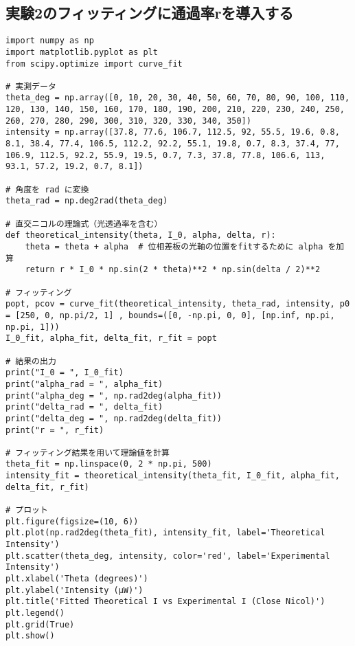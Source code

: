 \documentclass{article}
\begin{document}
\subsection*{実験2のフィッティングに通過率rを導入する}
\begin{lstlisting}
import numpy as np
import matplotlib.pyplot as plt
from scipy.optimize import curve_fit

# 実測データ
theta_deg = np.array([0, 10, 20, 30, 40, 50, 60, 70, 80, 90, 100, 110, 120, 130, 140, 150, 160, 170, 180, 190, 200, 210, 220, 230, 240, 250, 260, 270, 280, 290, 300, 310, 320, 330, 340, 350])
intensity = np.array([37.8, 77.6, 106.7, 112.5, 92, 55.5, 19.6, 0.8, 8.1, 38.4, 77.4, 106.5, 112.2, 92.2, 55.1, 19.8, 0.7, 8.3, 37.4, 77, 106.9, 112.5, 92.2, 55.9, 19.5, 0.7, 7.3, 37.8, 77.8, 106.6, 113, 93.1, 57.2, 19.2, 0.7, 8.1])

# 角度を rad に変換
theta_rad = np.deg2rad(theta_deg)

# 直交ニコルの理論式（光透過率を含む）
def theoretical_intensity(theta, I_0, alpha, delta, r):
    theta = theta + alpha  # 位相差板の光軸の位置をfitするために alpha を加算
    return r * I_0 * np.sin(2 * theta)**2 * np.sin(delta / 2)**2

# フィッティング
popt, pcov = curve_fit(theoretical_intensity, theta_rad, intensity, p0 = [250, 0, np.pi/2, 1] , bounds=([0, -np.pi, 0, 0], [np.inf, np.pi, np.pi, 1]))
I_0_fit, alpha_fit, delta_fit, r_fit = popt

# 結果の出力
print("I_0 = ", I_0_fit)
print("alpha_rad = ", alpha_fit)
print("alpha_deg = ", np.rad2deg(alpha_fit))
print("delta_rad = ", delta_fit)
print("delta_deg = ", np.rad2deg(delta_fit))
print("r = ", r_fit)

# フィッティング結果を用いて理論値を計算
theta_fit = np.linspace(0, 2 * np.pi, 500)
intensity_fit = theoretical_intensity(theta_fit, I_0_fit, alpha_fit, delta_fit, r_fit)

# プロット
plt.figure(figsize=(10, 6))
plt.plot(np.rad2deg(theta_fit), intensity_fit, label='Theoretical Intensity')
plt.scatter(theta_deg, intensity, color='red', label='Experimental Intensity')
plt.xlabel('Theta (degrees)')
plt.ylabel('Intensity (μW)')
plt.title('Fitted Theoretical I vs Experimental I (Close Nicol)')
plt.legend()
plt.grid(True)
plt.show()
\end{lstlisting}

\newpage
\end{document}
